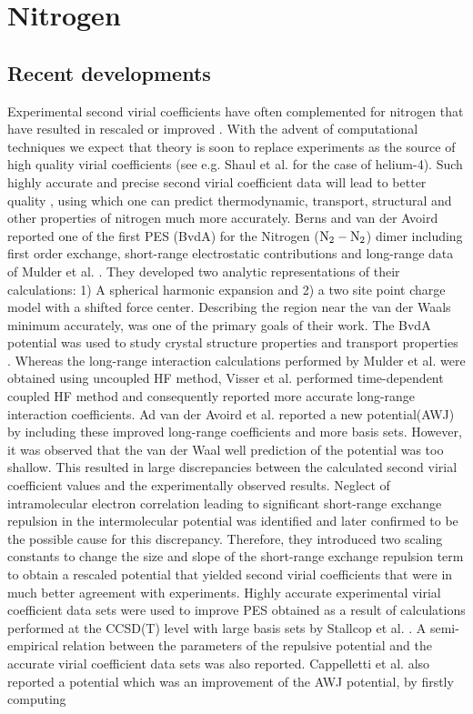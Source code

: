 \chapter{Nitrogen}
\label{chap:n2}
\SCBtrue
\section{Recent developments}
            Experimental second virial coefficients have often complemented \abinitio{} \PESs{} for nitrogen that have resulted in rescaled or improved \PESs{}. With the advent of computational techniques we expect that theory is soon to replace experiments as the source of high quality virial coefficients (see e.g. Shaul et al. \cite{Shaul2012SC} for the case of helium-4). Such highly accurate and precise second virial coefficient data will lead to better quality \PESs{}, using which one can predict thermodynamic, transport, structural and other properties of nitrogen much more accurately. Berns and van der Avoird \cite{Berns1980} reported one of the first \abinitio{} PES (BvdA) for the Nitrogen (${\rm N_2 - N_2}$) dimer including first order exchange, short-range electrostatic contributions and long-range data of Mulder et al. \cite{Mulder1980}. They developed two analytic representations of their calculations: 1) A spherical harmonic expansion and 2) a two site point charge model with a shifted force center. Describing the region near the van der Waals minimum accurately, was one of the primary goals of their work. The BvdA potential was used to study crystal structure properties \cite{Luty1980} and transport properties \cite{Nyeland1984}. Whereas the long-range interaction calculations performed by Mulder et al. \cite{Mulder1980} were obtained using uncoupled HF method, Visser et al. \cite{Visser1983} performed time-dependent coupled HF method and consequently reported more accurate long-range interaction coefficients. Ad van der Avoird et al. \cite{vanDerAvoird1986} reported a new potential(AWJ) by including these improved long-range coefficients and more basis sets. However, it was observed that the van der Waal well prediction of the potential was too shallow. This resulted in large discrepancies between the calculated second virial coefficient values and the experimentally observed results. Neglect of intramolecular electron correlation leading to significant short-range exchange repulsion in the intermolecular potential was identified and later confirmed to be the possible cause for this discrepancy. Therefore, they introduced two scaling constants to change the size and slope of the short-range exchange repulsion term to obtain a rescaled potential that yielded second virial coefficients that were in much better agreement with experiments. Highly accurate experimental virial coefficient data sets were used to improve \abinitio{} PES obtained as a result of calculations performed at the CCSD(T) level with large basis sets by Stallcop et al. \cite{Stallcop1997}. A semi-empirical relation between the parameters of the repulsive potential and the accurate virial coefficient data sets was also reported. Cappelletti et al. \cite{Cappelletti1998} also reported a potential which was an improvement of the AWJ potential, by firstly computing 